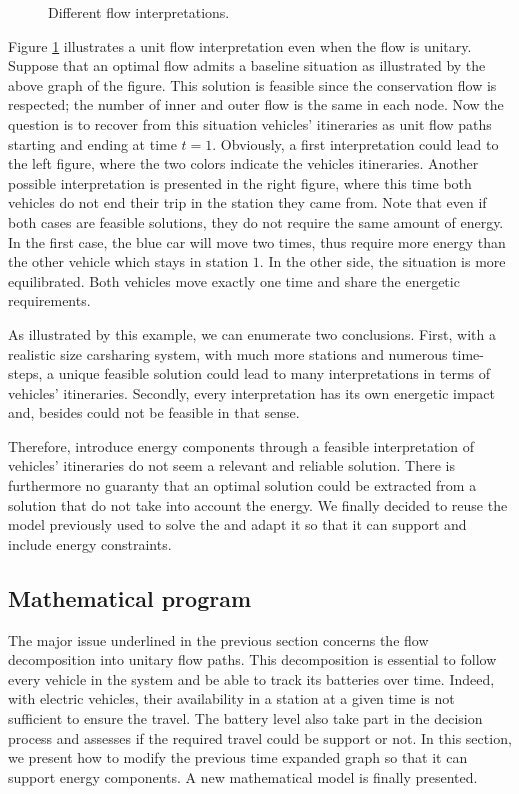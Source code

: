 \begin{bibunit}[ieeetr]
\begin{figure}[t]
\begin{center}

\end{center}
\caption{Different flow interpretations.}
\label{fig:flowInterpretation}
\end{figure}

\medskip
Figure \ref{fig:flowInterpretation} illustrates a unit flow interpretation even when the flow is unitary.
Suppose that an optimal flow admits a baseline situation as illustrated by the above graph of the figure.
This solution is feasible since the conservation flow is respected; the number of inner and outer flow is the same in each node.
Now the question is to recover from this situation vehicles' itineraries as unit flow paths starting and ending at time $t=1$.
Obviously, a first interpretation could lead to the left figure, where the two colors indicate the vehicles itineraries.
Another possible interpretation is presented in the right figure, where this time both vehicles do not end their trip in the station they came from.
Note that even if both cases are feasible solutions, they do not require the same amount of energy.
In the first case, the blue car will move two times, thus require more energy than the other vehicle which stays in station $1$.
In the other side, the situation is more equilibrated.
Both vehicles move exactly one time and share the energetic requirements.

\medskip
As illustrated by this example, we can enumerate two conclusions.
First, with a realistic size carsharing system, \ie with much more stations and numerous time-steps, a unique feasible solution could lead to many interpretations in terms of vehicles' itineraries.
Secondly, every interpretation has its own energetic impact and, besides could not be feasible in that sense. 

Therefore, introduce energy components through a feasible interpretation of vehicles' itineraries do not seem a relevant and reliable solution.
There is furthermore no guaranty that an optimal solution could be extracted from a solution that do not take into account the energy.
We finally decided to reuse the model previously used to solve the {\SLP} and adapt it so that it can support and include energy constraints.


\subsection{Mathematical program}
The major issue underlined in the previous section concerns the flow decomposition into unitary flow paths.
This decomposition is essential to follow every vehicle in the system and be able to track its batteries over time.
Indeed, with electric vehicles, their availability in a station at a given time is not sufficient to ensure the travel.
The battery level also take part in the decision process and assesses if the required travel could be support or not.
In this section, we present how to modify the previous time expanded graph so that it can support energy components.
A new mathematical model is finally presented.


\end{bibunit}

